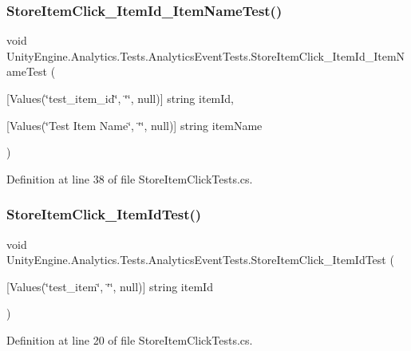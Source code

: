 \subsubsection{\texorpdfstring{StoreItemClick\_ItemId\_ItemNameTest()}{StoreItemClick\_ItemId\_ItemNameTest()}}
{\footnotesize\ttfamily void Unity\+Engine.\+Analytics.\+Tests.\+Analytics\+Event\+Tests.\+Store\+Item\+Click\+\_\+\+Item\+Id\+\_\+\+Item\+Name\+Test (\begin{DoxyParamCaption}\item[{\mbox{[}\+Values(\char`\"{}test\+\_\+item\+\_\+id\char`\"{}, \char`\"{}\char`\"{}, null)\mbox{]} string}]{item\+Id,  }\item[{\mbox{[}\+Values(\char`\"{}\+Test Item Name\char`\"{}, \char`\"{}\char`\"{}, null)\mbox{]} string}]{item\+Name }\end{DoxyParamCaption})}



Definition at line 38 of file Store\+Item\+Click\+Tests.\+cs.

\mbox{\label{class_unity_engine_1_1_analytics_1_1_tests_1_1_analytics_event_tests_a96cd3363401266c7f364590a712d7146}} 
\subsubsection{\texorpdfstring{StoreItemClick\_ItemIdTest()}{StoreItemClick\_ItemIdTest()}}
{\footnotesize\ttfamily void Unity\+Engine.\+Analytics.\+Tests.\+Analytics\+Event\+Tests.\+Store\+Item\+Click\+\_\+\+Item\+Id\+Test (\begin{DoxyParamCaption}\item[{\mbox{[}\+Values(\char`\"{}test\+\_\+item\char`\"{}, \char`\"{}\char`\"{}, null)\mbox{]} string}]{item\+Id }\end{DoxyParamCaption})}



Definition at line 20 of file Store\+Item\+Click\+Tests.\+cs.

\mbox{\label{class_unity_engine_1_1_analytics_1_1_tests_1_1_analytics_event_tests_ac3e710a862ec62e1a2a4760eef4b6483}} 

